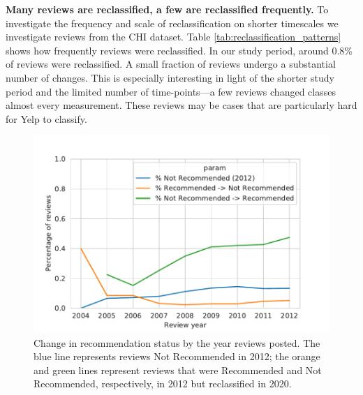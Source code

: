 \textbf{Many reviews are reclassified, a few are reclassified frequently.} To investigate the frequency and scale of reclassification on shorter timescales we investigate reviews from the CHI dataset. Table \ref{tab:reclassification_patterns} shows how frequently reviews were reclassified. In our study period, around 0.8\% of reviews were reclassified. A small fraction of reviews undergo a substantial number of changes. This is especially interesting in light of the shorter study period and the limited number of time-points---a few reviews changed classes almost every measurement. These reviews may be cases that are particularly hard for Yelp to classify. 


\begin{figure}[t]
    \centering
    \includegraphics[width=0.9\columnwidth]{figures/filtering_changes.pdf}
    \caption{Change in recommendation status by the year reviews posted. The blue line represents reviews Not Recommended in 2012; the orange and green lines represent reviews that were Recommended and Not Recommended, respectively, in 2012 but reclassified in 2020. %
    }
    \label{fig:filtered_change}
\end{figure}

